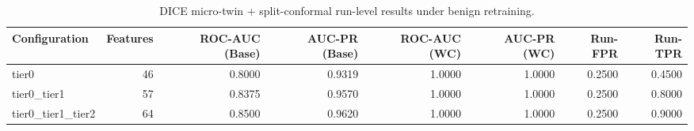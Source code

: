 \begin{table}[t]
\centering
\caption{DICE micro-twin + split-conformal run-level results under benign retraining.}
\label{tab:dice_full_overall}
\footnotesize
\begin{tabular}{lrrrrrrr}
\toprule
Configuration & Features & ROC-AUC (Base) & AUC-PR (Base) & ROC-AUC (WC) & AUC-PR (WC) & Run-FPR & Run-TPR \\
\midrule
tier0 & 46 & 0.8000 & 0.9319 & 1.0000 & 1.0000 & 0.2500 & 0.4500 \\
tier0_tier1 & 57 & 0.8375 & 0.9570 & 1.0000 & 1.0000 & 0.2500 & 0.8000 \\
tier0_tier1_tier2 & 64 & 0.8500 & 0.9620 & 1.0000 & 1.0000 & 0.2500 & 0.9000 \\
\bottomrule
\end{tabular}

\end{table}

